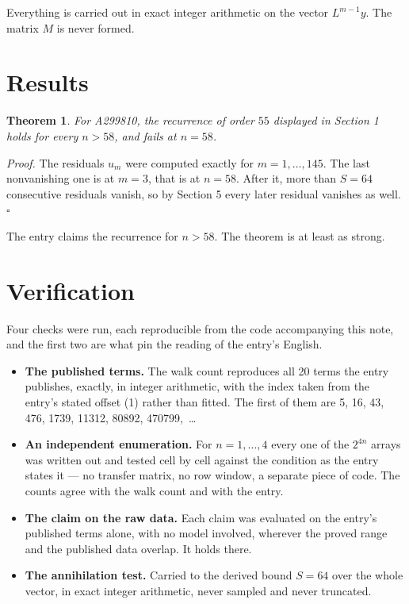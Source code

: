 \documentclass[11pt]{article}
\newtheorem{theorem}{Theorem}
\theoremstyle{definition}
\begin{document}
Everything is carried out in exact integer arithmetic on the vector $L^{m-1}y$. The matrix $M$ is never formed.

\section{Results}

\begin{theorem} For A299810, the recurrence of order $55$ displayed in Section 1 holds for every $n > 58$, and fails at $n = 58$.\end{theorem}

{\itshape Proof.} The residuals $u_m$ were computed exactly for $m = 1,\dots,145$. The last nonvanishing one is at $m = 3$, that is at $n = 58$. After it, more than $S = 64$ consecutive residuals vanish, so by Section 5 every later residual vanishes as well. $\square$

The entry claims the recurrence for $n > 58$. The theorem is at least as strong.

\section{Verification}

Four checks were run, each reproducible from the code accompanying this note, and the first two are what pin the reading of the entry's English.

\begin{itemize}

\item {\bfseries The published terms.} The walk count reproduces all 20 terms the entry publishes, exactly, in integer arithmetic, with the index taken from the entry's stated offset (1) rather than fitted. The first of them are 5, 16, 43, 476, 1739, 11312, 80892, 470799,~\dots

\item {\bfseries An independent enumeration.} For $n = 1,\dots,4$ every one of the $2^{4n}$ arrays was written out and tested cell by cell against the condition as the entry states it --- no transfer matrix, no row window, a separate piece of code. The counts agree with the walk count and with the entry.

\item {\bfseries The claim on the raw data.} Each claim was evaluated on the entry's published terms alone, with no model involved, wherever the proved range and the published data overlap. It holds there.

\item {\bfseries The annihilation test.} Carried to the derived bound $S = 64$ over the whole vector, in exact integer arithmetic, never sampled and never truncated.

\end{itemize}
\end{document}
